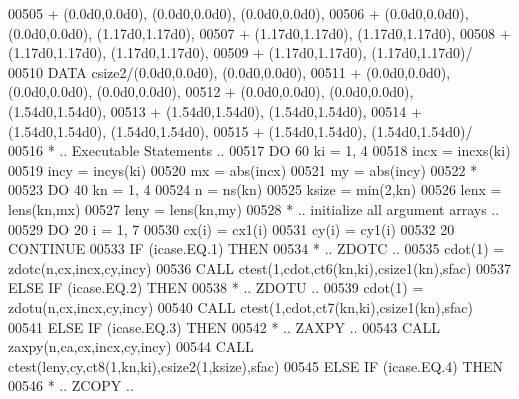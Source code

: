 \begin{DoxyCode}
00505      +                  (0.0d0,0.0d0), (0.0d0,0.0d0), (0.0d0,0.0d0),
00506      +                  (0.0d0,0.0d0), (0.0d0,0.0d0), (1.17d0,1.17d0),
00507      +                  (1.17d0,1.17d0), (1.17d0,1.17d0),
00508      +                  (1.17d0,1.17d0), (1.17d0,1.17d0),
00509      +                  (1.17d0,1.17d0), (1.17d0,1.17d0)/
00510       \textcolor{keyword}{DATA}              csize2/(0.0d0,0.0d0), (0.0d0,0.0d0),
00511      +                  (0.0d0,0.0d0), (0.0d0,0.0d0), (0.0d0,0.0d0),
00512      +                  (0.0d0,0.0d0), (0.0d0,0.0d0), (1.54d0,1.54d0),
00513      +                  (1.54d0,1.54d0), (1.54d0,1.54d0),
00514      +                  (1.54d0,1.54d0), (1.54d0,1.54d0),
00515      +                  (1.54d0,1.54d0), (1.54d0,1.54d0)/
00516 \textcolor{comment}{*     .. Executable Statements ..}
00517       \textcolor{keywordflow}{DO} 60 ki = 1, 4
00518          incx = incxs(ki)
00519          incy = incys(ki)
00520          mx = abs(incx)
00521          my = abs(incy)
00522 \textcolor{comment}{*}
00523          \textcolor{keywordflow}{DO} 40 kn = 1, 4
00524             n = ns(kn)
00525             ksize = min(2,kn)
00526             lenx = lens(kn,mx)
00527             leny = lens(kn,my)
00528 \textcolor{comment}{*           .. initialize all argument arrays ..}
00529             \textcolor{keywordflow}{DO} 20 i = 1, 7
00530                cx(i) = cx1(i)
00531                cy(i) = cy1(i)
00532    20       \textcolor{keywordflow}{CONTINUE}
00533             \textcolor{keywordflow}{IF} (icase.EQ.1) \textcolor{keywordflow}{THEN}
00534 \textcolor{comment}{*              .. ZDOTC ..}
00535                cdot(1) = zdotc(n,cx,incx,cy,incy)
00536                \textcolor{keyword}{CALL }ctest(1,cdot,ct6(kn,ki),csize1(kn),sfac)
00537             \textcolor{keywordflow}{ELSE} \textcolor{keywordflow}{IF} (icase.EQ.2) \textcolor{keywordflow}{THEN}
00538 \textcolor{comment}{*              .. ZDOTU ..}
00539                cdot(1) = zdotu(n,cx,incx,cy,incy)
00540                \textcolor{keyword}{CALL }ctest(1,cdot,ct7(kn,ki),csize1(kn),sfac)
00541             \textcolor{keywordflow}{ELSE} \textcolor{keywordflow}{IF} (icase.EQ.3) \textcolor{keywordflow}{THEN}
00542 \textcolor{comment}{*              .. ZAXPY ..}
00543                \textcolor{keyword}{CALL }zaxpy(n,ca,cx,incx,cy,incy)
00544                \textcolor{keyword}{CALL }ctest(leny,cy,ct8(1,kn,ki),csize2(1,ksize),sfac)
00545             \textcolor{keywordflow}{ELSE} \textcolor{keywordflow}{IF} (icase.EQ.4) \textcolor{keywordflow}{THEN}
00546 \textcolor{comment}{*              .. ZCOPY ..}

\end{DoxyCode}
